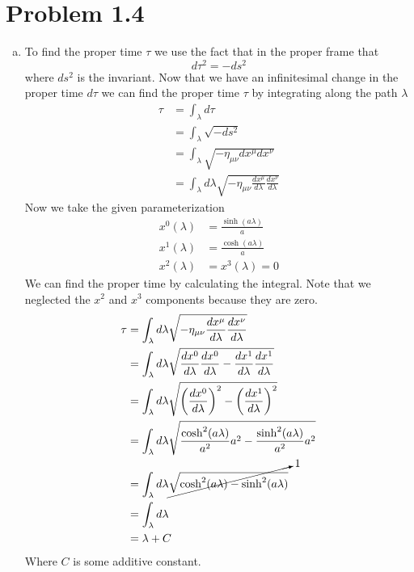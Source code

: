 \documentclass[11pt]{article}
\numberwithin{equation}{section}
\begin{document}
\section{Problem 1.4}
\begin{enumerate}[(a)]
\item
To find the proper time $\tau$ we use the fact that in the proper frame that
$$d\tau^2 = -ds^2$$
where $ds^2$ is the invariant. Now that we have an infinitesimal change in the proper time $d\tau$ we can find the proper time $\tau$ by integrating along the path $\lambda$
\begin{align*}
\tau &= \int_{\lambda}d\tau\\
&= \int_{\lambda}\sqrt{-ds^2}\\
&= \int_{\lambda}\sqrt{-\eta_{\mu\nu}dx^{\mu}dx^{\nu}}\\
&= \int_{\lambda}d\lambda\sqrt{-\eta_{\mu\nu}\frac{dx^{\mu}}{d\lambda}\frac{dx^{\nu}}{d\lambda}}
\end{align*}
Now we take the given parameterization
\begin{align*}
x^0(\lambda) &= \frac{\sinh(a\lambda)}{a}\\
x^1(\lambda) &= \frac{\cosh(a\lambda)}{a}\\
x^2(\lambda) &= x^3(\lambda) = 0
\end{align*}
We can find the proper time by calculating the integral. Note that we neglected the $x^2$ and $x^3$ components because they are zero.
\begin{align*}
\tau &= \int_{\lambda}d\lambda\sqrt{-\eta_{\mu\nu}\frac{dx^{\mu}}{d\lambda}\frac{dx^{\nu}}{d\lambda}}\\
&= \int_{\lambda}d\lambda\sqrt{\frac{dx^{0}}{d\lambda}\frac{dx^{0}}{d\lambda}-\frac{dx^{1}}{d\lambda}\frac{dx^{1}}{d\lambda}}\\
&= \int_{\lambda}d\lambda\sqrt{\left(\frac{dx^{0}}{d\lambda}\right)^2-\left(\frac{dx^{1}}{d\lambda}\right)^2}\\
&= \int_{\lambda}d\lambda\sqrt{\frac{\cosh^2(a\lambda)}{a^2}a^2-\frac{\sinh^2(a\lambda)}{a^2}a^2}\\
&= \int_{\lambda}d\lambda\cancelto{1}{\sqrt{\cosh^2(a\lambda)-\sinh^2(a\lambda)}}\\
&= \int_{\lambda}d\lambda\\
&= \lambda + C
\end{align*}
Where $C$ is some additive constant.


\end{enumerate}
\end{document}
